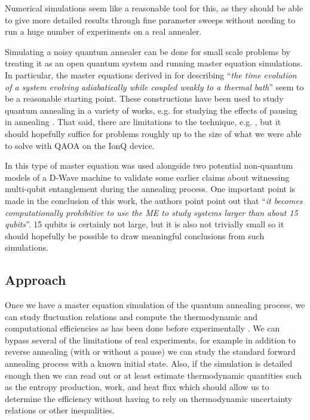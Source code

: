 \documentclass[aps,pra,amsmath,amssymb,amsfonts,lengthcheck,twocolumn,superscriptaddress]{revtex4-1}
\begin{document}
Numerical simulations seem like a reasonable tool for this, as they should be able to give more detailed results through fine parameter sweeps without needing to run a huge number of experiments on a real annealer.

Simulating a noisy quantum annealer can be done for small scale problems by treating it as an open quantum system and running master equation simulations. 
In particular, the master equations derived in \cite{Albash2012} for describing ``\emph{the time evolution of a system evolving adiabatically while coupled weakly to a thermal bath}'' seem to be a reasonable starting point. These constructions have been used to study quantum annealing in a variety of works, e.g. for studying the effects of pausing in annealing \cite{Chen2020}. 
That said, there are limitations to the technique, e.g. \cite{Bando22}, but it should hopefully suffice for problems roughly up to the size of what we were able to solve with QAOA on the IonQ device.

In \cite{Albash2015b} this type of master equation was used alongside two potential non-quantum models of a D-Wave machine to validate some earlier claims about witnessing multi-qubit entanglement during the annealing process. 
One important point is made in the conclusion of this work, the authors point point out that ``\emph{it becomes computationally prohibitive to use the ME to study systems larger than about 15 qubits}''. 
15 qubits is certainly not large, but it is also not trivially small so it should hopefully be possible to draw meaningful conclusions from such simulations.

\subsection{Approach}

Once we have a master equation simulation of the quantum annealing process, we can study fluctuation relations and compute the thermodynamic and computational efficiencies as has been done before experimentally \cite{Smierzchalski2024, Campisi2021, Buffoni2020, Gardas2018}. 
We can bypass several of the limitations of real experiments, for example in addition to reverse annealing (with or without a pause) we can study the standard forward annealing process with a known initial state.
Also, if the simulation is detailed enough then we can read out or at least estimate thermodynamic quantities such as the entropy production, work, and heat flux which should allow us to determine the efficiency without having to rely on thermodynamic uncertainty relations or other inequalities. 
\end{document}
